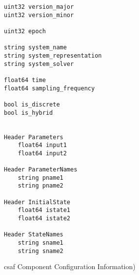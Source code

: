 \begin{figure}
\begin{lstlisting}
uint32 version_major
uint32 version_minor

uint32 epoch

string system_name
string system_representation
string system_solver

float64 time
float64 sampling_frequency

bool is_discrete
bool is_hybrid


Header Parameters
	float64 input1
	float64 input2
	
Header ParameterNames
	string pname1
	string pname2
	
Header InitialState
	float64 istate1
	float64 istate2
	
Header StateNames
	string sname1
	string sname2
\end{lstlisting}
\caption{ \acrshort{csaf}  Component Configuration Information)}
\label{fig:cmsg}
\end{figure}


